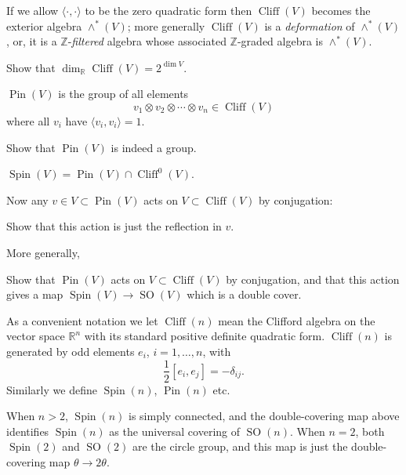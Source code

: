 \documentclass[12pt,letterpaper,reqno]{article}
\numberwithin{equation}{section}
\newcommand{\R}{\ensuremath{\mathbb R}}
\newcommand{\Z}{\ensuremath{\mathbb Z}}
\newcommand{\half}{\ensuremath{\frac{1}{2}}}
\newcommand{\IP}[1]{\langle#1\rangle}
\newcommand{\ti}[1]{\textit{#1}}
\DeclareMathOperator{\Pin}{Pin}
\DeclareMathOperator{\Spin}{Spin}
\DeclareMathOperator{\SO}{SO}
\DeclareMathOperator{\Cliff}{Cliff}
\begin{document}
If we allow $\IP{\cdot,\cdot}$ to be the zero quadratic form then $\Cliff(V)$
becomes the exterior algebra $\wedge^*(V)$; more generally $\Cliff(V)$ is
a \ti{deformation} of $\wedge^*(V)$, or, it is a $\Z$-\ti{filtered} algebra 
whose associated $\Z$-graded algebra is $\wedge^*(V)$.

\begin{exercise} Show that $\dim_\R \Cliff(V) = 2^{\dim V}$.
\end{exercise}

\begin{defn} $\Pin(V)$ is the group of all elements
\begin{equation}
 v_1 \otimes v_2 \otimes \cdots \otimes v_n \in \Cliff(V)
\end{equation}
where all $v_i$ have $\IP{v_i,v_i} = 1$.
\end{defn}

\begin{exercise} Show that $\Pin(V)$ is indeed a group.
\end{exercise}

\begin{defn} $\Spin(V) = \Pin(V) \cap \Cliff^0(V)$.
\end{defn}

Now any $v \in V \subset \Pin(V)$ acts on $V \subset \Cliff(V)$
by conjugation:
\begin{exercise}
Show that this action is just the reflection in $v$.
\end{exercise}
More generally,
\begin{exercise} Show that $\Pin(V)$ acts on $V \subset \Cliff(V)$ 
by conjugation, and that this action gives a map $\Spin(V) \to \SO(V)$ which 
is a double cover.
\end{exercise}

As a convenient notation we let $\Cliff(n)$ mean the Clifford algebra on the
vector space $\R^n$ with its standard positive definite quadratic form.
$\Cliff(n)$ is generated by odd elements $e_i$, $i = 1, \dots, n$, with 
\begin{equation}
  \half [e_i, e_j] = -\delta_{ij}.
\end{equation}
Similarly we define $\Spin(n)$, $\Pin(n)$ etc.

When $n > 2$, $\Spin(n)$ is simply connected, and the 
double-covering map above identifies
$\Spin(n)$ as the universal covering of $\SO(n)$. When $n=2$, both $\Spin(2)$
and $\SO(2)$ are the circle group, and this map is just the double-covering
map $\theta \to 2 \theta$.
\end{document}
